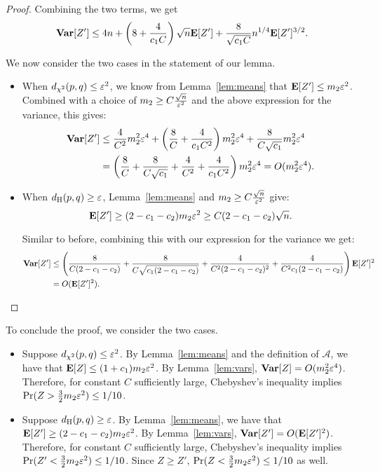\begin{proof}
Combining the two terms, we get
$$\mbox{\bf Var}[Z'] \leq 4n + \left(8 + \frac{4}{c_1C}\right)\sqrt{n} \mbox{\bf E}[Z']  + \frac{8}{\sqrt{c_1C}}n^{1/4} \mbox{\bf E}[Z']^{3/2}  .$$

We now consider the two cases in the statement of our lemma.
\begin{itemize}
\item
When $d_{\chi^2}(p,q) \leq \varepsilon^2$, we know from Lemma~\ref{lem:means} that $\mbox{\bf E}[Z'] \leq m_2 \varepsilon^2$. 
Combined with a choice of $m_2 \geq C \frac{\sqrt{n}}{\varepsilon^2}$ and the above expression for the variance, this gives:
\begin{align*}
\mbox{\bf Var}[Z']
& \leq \frac{4}{C^2}m_2^2\varepsilon^4 + \left(\frac{8}{C} + \frac{4}{c_1C^2}\right)m_2^2 \varepsilon^4+ \frac{8}{C\sqrt{c_1}}m_2^2 \varepsilon^4 \\
& = \left(\frac{8}{C} + \frac{8}{C\sqrt{c_1}} + \frac{4}{C^2} + \frac{4}{c_1C^2} \right)m_2^2 \varepsilon^4 = O(m_2^2 \varepsilon^4).
\end{align*}

\item When $d_{\mathrm {H}}(p,q) \geq \varepsilon$, Lemma~\ref{lem:means} and  $m_2 \geq C\frac{\sqrt{n}}{\varepsilon^2}$ give:
$$\mbox{\bf E}[Z'] \geq (2 - c_1 - c_2) m_2 \varepsilon^2 \geq C(2 - c_1 - c_2) \sqrt{n}.$$

Similar to before, combining this with our expression for the variance we get:
\begin{align*}
\mbox{\bf Var}[Z']
&\leq \left(\frac{8}{C(2 -c_1 - c_2)} + \frac{8}{C\sqrt{c_1 (2 - c_1 - c_2)}} +  \frac{4}{C^2(2-c_1-c_2)^2} + \frac{4}{C^2c_1(2 - c_1 - c_2)} \right) \mbox{\bf E}[Z']^2 \\
&= O(\mbox{\bf E}[Z']^2).\qedhere
\end{align*}
\end{itemize}
\end{proof}

To conclude the proof, we consider the two cases.
\begin{itemize}
\item Suppose $d_{\chi^2}(p,q) \leq \varepsilon^2$. 
By Lemma~\ref{lem:means} and the definition of $\mathcal{A}$, we have that $\mbox{\bf E}[Z] \leq (1 + c_1)m_2\varepsilon^2$. 
By Lemma~\ref{lem:vars}, $\mbox{\bf Var}[Z] = O(m_2^2\varepsilon^4)$.
Therefore, for constant $C$ sufficiently large, Chebyshev's inequality implies $\Pr(Z > \frac32 m_2 \varepsilon^2) \leq 1/10$.
\item
Suppose $d_{\mathrm {H}}(p,q) \geq \varepsilon$.
By Lemma~\ref{lem:means}, we have that $\mbox{\bf E}[Z'] \geq (2 - c_1 - c_2)m_2\varepsilon^2$. 
By Lemma~\ref{lem:vars}, $\mbox{\bf Var}[Z'] = O(\mbox{\bf E}[Z']^2)$.
Therefore, for constant $C$ sufficiently large, Chebyshev's inequality implies $\Pr(Z' < \frac32 m_2 \varepsilon^2) \leq 1/10$.
Since $Z \geq Z'$, $\Pr(Z < \frac32 m_2 \varepsilon^2) \leq 1/10$ as well.
\end{itemize}

